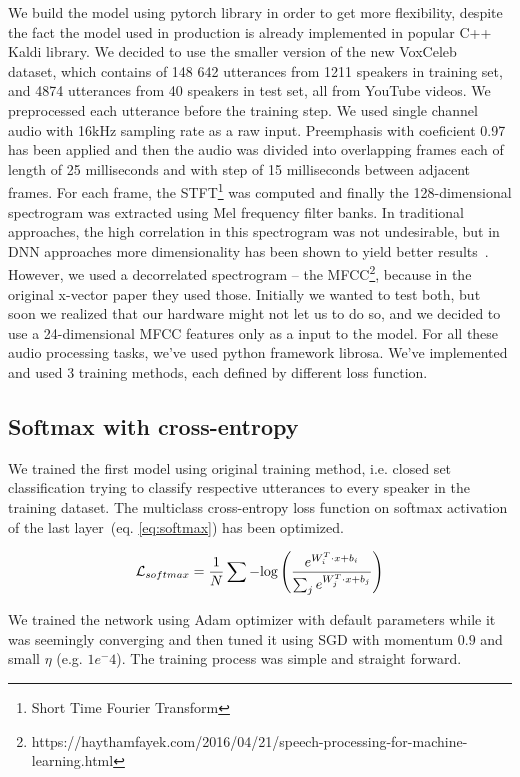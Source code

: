 We build the model using pytorch library in order to get more flexibility, despite the fact the model used in production is already implemented in popular C++ Kaldi library. We decided to use the smaller version of the new VoxCeleb~\cite{VoxCeleb} dataset, which contains of 148 642 utterances from 1211 speakers in training set, and 4874 utterances from 40 speakers in test set, all from YouTube videos. We preprocessed each utterance before the training step. We used single channel audio with 16kHz sampling rate as a raw input. Preemphasis with coeficient 0.97 has been applied and then the audio was divided into overlapping frames each of length of 25 milliseconds and with step of 15 milliseconds between adjacent frames. For each frame, the STFT\footnote{Short Time Fourier Transform} was computed and finally the 128-dimensional spectrogram was extracted using Mel frequency filter banks. In traditional approaches, the high correlation in this spectrogram was not undesirable, but in DNN approaches more dimensionality has been shown to yield better results~\cite{CNN_2016}. However, we used a decorrelated spectrogram -- the MFCC\footnote{https://haythamfayek.com/2016/04/21/speech-processing-for-machine-learning.html}, because in the original x-vector paper they used those. Initially we wanted to test both, but soon we realized that our hardware might not let us to do so, and we decided to use a 24-dimensional MFCC features only as a input to the model. For all these audio processing tasks, we've used python framework librosa. We've implemented and used 3 training methods, each defined by different loss function.

\subsection*{Softmax with cross-entropy}

We trained the first model using original training method, i.e. closed set classification trying to classify respective utterances to every speaker in the training dataset. The multiclass cross-entropy loss function on softmax activation of the last layer~(eq. \ref{eq:softmax}) has been optimized.

\begin{equation} \label{eq:softmax}
\mathcal{L}_{softmax} = \frac{1}{N} \sum - \textnormal{log} \left( 
\frac{e^{W_i^T \cdot x + b_i}}{\sum_{j} e^{W_j^T \cdot x + b_j}} 
\right)
\end{equation}

\pagebreak
\noindent
We trained the network using Adam optimizer with default parameters while it was seemingly converging and then tuned it using SGD with momentum $ 0.9 $ and small $ \eta $ (e.g. $ 1e^-4 $). The training process was simple and straight forward.

